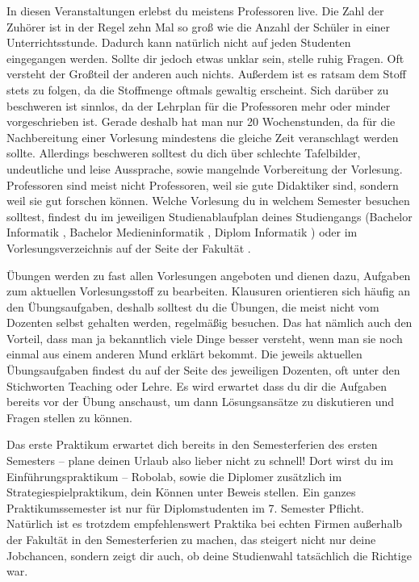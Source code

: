 In diesen Veranstaltungen erlebst du meistens Professoren live.
Die Zahl der Zuhörer ist in der Regel zehn Mal so groß wie die Anzahl der Schüler in einer Unterrichtsstunde. Dadurch kann natürlich nicht auf jeden Studenten eingegangen werden. Sollte dir jedoch etwas unklar sein, stelle ruhig Fragen. Oft versteht der Großteil der anderen auch nichts.
Außerdem ist es ratsam dem Stoff stets zu folgen, da die Stoffmenge oftmals gewaltig erscheint. Sich darüber zu beschweren ist sinnlos, da der Lehrplan für die Professoren mehr oder minder vorgeschrieben ist.
Gerade deshalb hat man nur 20 Wochenstunden, da für die Nachbereitung einer Vorlesung mindestens die gleiche Zeit veranschlagt werden sollte.
Allerdings beschweren solltest du dich über schlechte Tafelbilder, undeutliche und leise Aussprache, sowie mangelnde Vorbereitung der Vorlesung. 
Professoren sind meist nicht Professoren, weil sie gute Didaktiker sind, sondern weil sie gut forschen können.
Welche Vorlesung du in welchem Semester besuchen solltest, findest du im jeweiligen Studienablaufplan deines Studiengangs (Bachelor Informatik , Bachelor Medieninformatik , Diplom Informatik ) oder im Vorlesungsverzeichnis auf der Seite der Fakultät .



Übungen werden zu fast allen Vorlesungen angeboten und dienen dazu, Aufgaben zum aktuellen Vorlesungsstoff zu bearbeiten. Klausuren orientieren sich häufig an den Übungsaufgaben, deshalb solltest du die Übungen, die meist nicht vom Dozenten selbst gehalten werden, regelmäßig besuchen.
Das hat nämlich auch den Vorteil, dass man ja bekanntlich viele Dinge besser versteht, wenn man sie noch einmal aus einem anderen Mund erklärt bekommt.
Die jeweils aktuellen Übungsaufgaben findest du auf der Seite des jeweiligen Dozenten, oft unter den Stichworten Teaching oder Lehre.
Es wird erwartet dass du dir die Aufgaben bereits vor der Übung anschaust, um dann Lösungsansätze zu diskutieren und Fragen stellen zu können.



Das erste Praktikum erwartet dich bereits in den Semesterferien des ersten Semesters – plane deinen Urlaub also lieber nicht zu schnell!
Dort wirst du im Einführungspraktikum – Robolab, sowie die Diplomer zusätzlich im Strategiespielpraktikum, dein Können unter Beweis stellen.
Ein ganzes Praktikumssemester ist nur für Diplomstudenten im 7. Semester Pflicht.
Natürlich ist es trotzdem empfehlenswert Praktika bei echten Firmen außerhalb der Fakultät in den Semesterferien zu machen, das steigert nicht nur deine Jobchancen, sondern zeigt dir auch, ob deine Studienwahl tatsächlich die Richtige war.


